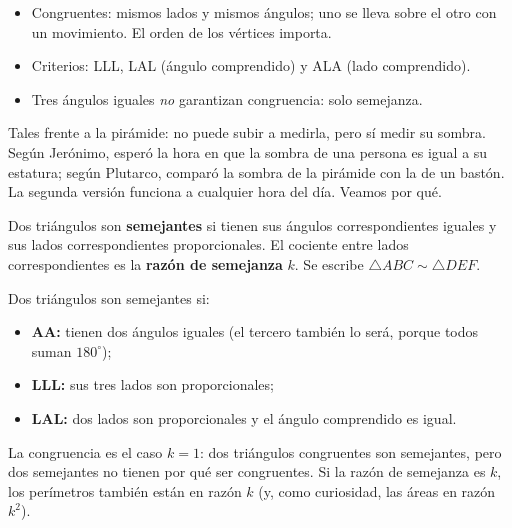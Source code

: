 \documentclass[11pt]{article}
\begin{document}
\begin{resumen}
\begin{itemize}
  \item Congruentes: mismos lados y mismos ángulos; uno se lleva sobre el
        otro con un movimiento. El orden de los vértices importa.
  \item Criterios: LLL, LAL (ángulo comprendido) y ALA (lado comprendido).
  \item Tres ángulos iguales \emph{no} garantizan congruencia: solo
        semejanza.
\end{itemize}
\end{resumen}

\label{tema:semejanza}

\begin{hilo}
Tales frente a la pirámide: no puede subir a medirla, pero sí medir su
sombra. Según Jerónimo, esperó la hora en que la sombra de una persona es
igual a su estatura; según Plutarco, comparó la sombra de la pirámide con la
de un bastón. La segunda versión funciona a cualquier hora del día. Veamos
por qué.
\end{hilo}

\begin{definicion}
Dos triángulos son \textbf{semejantes} si tienen sus ángulos
correspondientes iguales y sus lados correspondientes proporcionales. El
cociente entre lados correspondientes es la \textbf{razón de semejanza}
$k$. Se escribe $\triangle ABC \sim \triangle DEF$.
\end{definicion}

\begin{teorema}
Dos triángulos son semejantes si:
\begin{itemize}
  \item \textbf{AA:} tienen dos ángulos iguales (el tercero también lo
        será, porque todos suman $180^\circ$);
  \item \textbf{LLL:} sus tres lados son proporcionales;
  \item \textbf{LAL:} dos lados son proporcionales y el ángulo comprendido
        es igual.
\end{itemize}
\end{teorema}

La congruencia es el caso $k = 1$: dos triángulos congruentes son
semejantes, pero dos semejantes no tienen por qué ser congruentes. Si la
razón de semejanza es $k$, los perímetros también están en razón $k$ (y,
como curiosidad, las áreas en razón $k^2$).
\end{document}
